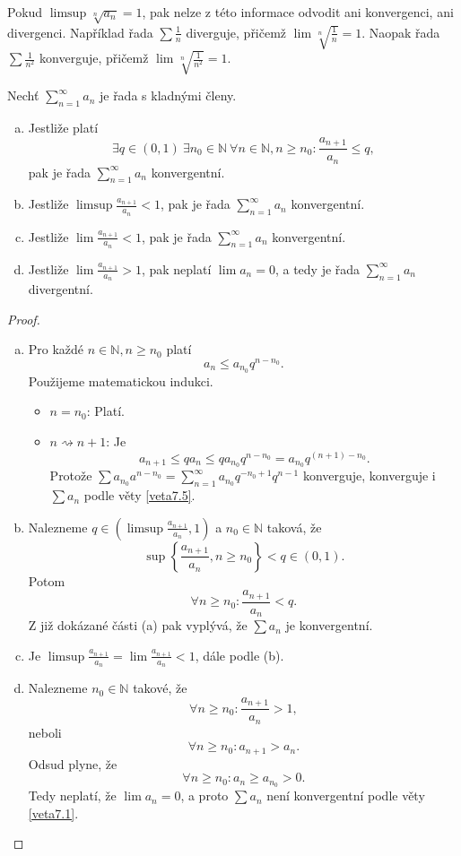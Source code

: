 \begin{poznamka}
	Pokud $\limsup \sqrt[n]{a_n} = 1$, pak nelze z této informace odvodit ani konvergenci, ani divergenci.
	Například řada $\sum \frac{1}{n}$ diverguje, přičemž $\lim \sqrt[n]{\frac{1}{n}} = 1$. Naopak
	řada $\sum \frac{1}{n^2}$ konverguje, přičemž $\lim \sqrt[n]{\frac{1}{n^2}}= 1$.
\end{poznamka}

\begin{veta}\label{veta7.8}
Nechť $\sum_{n=1}^{\infty} a_n$ je řada s kladnými členy.
\begin{enumerate}[(a)]
	\item Jestliže platí
\[
\exists q \in (0,1)\ \exists n_0 \in \mathbb{N}\ \forall n \in \mathbb{N}, n \ge n_0 :
\frac{a_{n+1}}{a_n} \le q,
\]
pak je řada $\sum_{n=1}^{\infty} a_n$ konvergentní.

\item  Jestliže $\limsup \frac{a_{n+1}}{a_n} < 1$, pak je řada
$\sum_{n=1}^{\infty} a_n$ konvergentní.
\item  Jestliže $\lim \frac{a_{n+1}}{a_n} < 1$, pak je řada
$\sum_{n=1}^{\infty} a_n$ konvergentní.

\item  Jestliže $\lim \frac{a_{n+1}}{a_n} > 1$, pak neplatí $\lim a_n = 0$,
a tedy je řada $\sum_{n=1}^{\infty} a_n$ divergentní.
\end{enumerate}
\end{veta}

\begin{proof}
\begin{enumerate}[(a)]
	\item Pro každé $n \in \mathbb N , n \geq n_0$ platí
	$$
	    a_n \leq a_{n_0}q^{n-n_0}.
	$$
	Použijeme matematickou indukci.
	\begin{itemize}
		\item $n = n_0$: Platí.
		\item $n \rightsquigarrow n+ 1$: Je
		$$a_{n+1} \leq qa_n \leq qa_{n_0}q^{n-n_0}=a_{n_0}q^{(n+1)-n_0}.$$
		Protože $\sum a_{n_0}a^{n-n_0}=\sum_{n=1}^\infty a_{n_0}q^{-n_0+1}q^{n-1}$ konverguje,
		konverguje i $\sum a_n$ podle věty \ref{veta7.5}.
	\end{itemize}
	\item Nalezneme $q \in \left( \limsup \frac{a_{n+1}}{a_n},1 \right ) $ a $n_0 \in \mathbb N $
	taková, že
	$$
	    \sup \left \{ \frac{a_{n+1}}{a_n}, n \geq n_0 \right \} < q \in (0,1).
	$$
	Potom
	$$
	    \forall n \geq n_0: \frac{a_{n+1}}{a_n} < q.
	$$
	Z již dokázané části (a) pak vyplývá, že $\sum a_n$ je konvergentní.
	\item Je $\limsup \frac{a_{n+1}}{a_n} = \lim \frac{a_{n+1}}{a_n} < 1$, dále podle (b).
	\item Nalezneme $n_0 \in \mathbb N $ takové, že
	$$
	    \forall n \geq n_0 : \frac{a_{n+1}}{a_n} > 1,
	$$
	neboli
	$$
	    \forall n \geq n_0: a_{n+1} > a_n.
	$$
	Odsud plyne, že
	$$
	    \forall n \geq n_0: a_n \geq a_{n_0} > 0.
	$$
	Tedy neplatí, že $\lim a_n = 0$, a proto $\sum a_n$ není konvergentní podle věty \ref{veta7.1}.\qedhere
\end{enumerate}
\end{proof}

